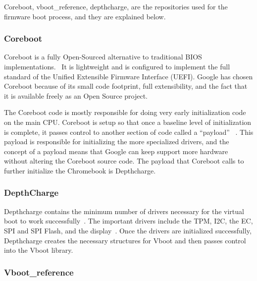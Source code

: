 \documentclass[../report.tex]{subfiles}
\begin{document}
Coreboot, vboot\_reference, depthcharge, are the repositories used for the firmware boot process, and they are explained below. 

\subsubsection{Coreboot}

Coreboot is a fully Open-Sourced alternative to traditional BIOS implementations.~\cite{coreboot}
It is lightweight and is configured to implement the full standard of the Unified Extensible Firmware Interface (UEFI).
Google has chosen Coreboot because of its small code footprint, full extensibility, and the fact that it is available freely as an Open Source project.

The Coreboot code is mostly responsible for doing very early initialization code on the main CPU\@. 
Coreboot is setup so that once a baseline level of initialization is complete, it passes control to another section of code called a ``payload'' ~\cite{coreboot-payload}.
This payload is responsible for initializing the more specialized drivers, and the concept of a payload means that Google can keep support more hardware without altering the Coreboot source code.
The payload that Coreboot calls to further initialize the Chromebook is Depthcharge.


\subsubsection{DepthCharge}

Depthcharge contains the minimum number of drivers necessary for the virtual boot to work successfully~\cite{depthcharge-codebase}. 
The important drivers include the TPM, I2C, the EC, SPI and SPI Flash, and the display~\cite{depthcharge-slides}.
Once the drivers are initialized successfully, Depthcharge creates the necessary structures for Vboot and then passes control into the Vboot library.

\subsubsection{Vboot\_reference}
\end{document}
